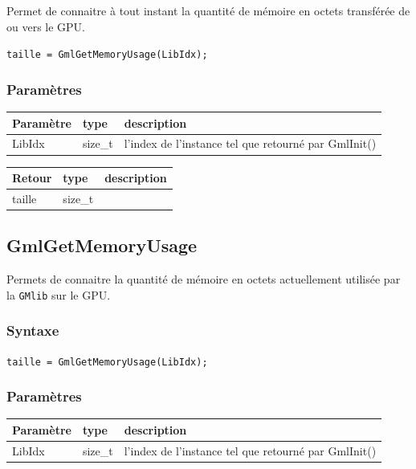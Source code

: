 \documentclass[a4paper,12pt]{article}
\begin{document}
Permet de connaitre à tout instant la quantité de mémoire en octets transférée de ou vers le GPU.

{\tt taille = GmlGetMemoryUsage(LibIdx);}

\subsubsection*{Paramètres}

\begin{tabular}{|m{2cm}|m{1.5cm}|m{10.5cm}|}
\hline
Paramètre  & type    & description \\
\hline
LibIdx     & size\_t & l'index de l'instance tel que retourné par GmlInit() \\
\hline
\end{tabular}

\medskip

\begin{tabular}{|m{2cm}|m{1.5cm}|m{10.5cm}|}
\hline
Retour     & type    & description \\
\hline
taille     & size\_t & \\
\hline
\end{tabular}


\subsection{GmlGetMemoryUsage}

Permets de connaitre la quantité de mémoire en octets actuellement utilisée par la {\tt GMlib} sur le GPU.

\subsubsection*{Syntaxe}

{\tt taille = GmlGetMemoryUsage(LibIdx);}

\subsubsection*{Paramètres}

\begin{tabular}{|m{2cm}|m{1.5cm}|m{10.5cm}|}
\hline
Paramètre  & type    & description \\
\hline
LibIdx     & size\_t & l'index de l'instance tel que retourné par GmlInit() \\
\hline
\end{tabular}

\medskip
\end{document}

